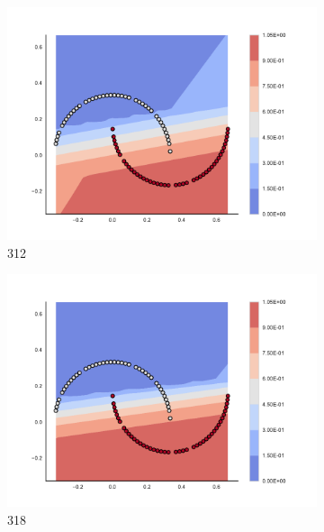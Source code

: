 \begin{figure}[h]
\begin{subfigure}[b]{0.09\textwidth}
    \includegraphics[clip, trim=2.35cm 1.75cm 4.5cm 0cm,width=\textwidth]{img/convergence/312.pdf}
    \caption{312}
    \label{fig:convergence_312}
\end{subfigure}
%
\begin{subfigure}[b]{0.09\textwidth}
    \includegraphics[clip, trim=2.35cm 1.75cm 4.5cm 0cm,width=\textwidth]{img/convergence/318.pdf}
    \caption{318}
    \label{fig:convergence_318}
\end{subfigure}
%
\begin{subfigure}[b]{0.09\textwidth}

\end{subfigure}
\end{figure}
